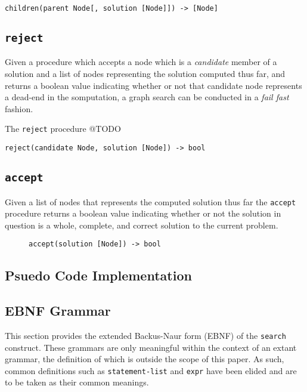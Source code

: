 \documentclass[runningheads]{llncs}
\newcommand{\code}[1]{\texttt{#1}}
\begin{document}
\begin{lstlisting}
children(parent Node[, solution [Node]]) -> [Node]
\end{lstlisting}

\subsection{\code{reject}}
Given a procedure which accepts a node which is a \textit{candidate} member of a solution and a list of nodes representing the solution computed thus far, and returns a boolean value indicating whether or not that candidate node represents a dead-end in the somputation, a graph search can be conducted in a \textit{fail fast} fashion.

The \code{reject} procedure @TODO

\begin{lstlisting}
reject(candidate Node, solution [Node]) -> bool
\end{lstlisting}

\subsection{\code{accept}}
Given a list of nodes that represents the computed solution thus far the \code{accept} procedure returns a boolean value indicating whether or not the solution in question is a whole, complete, and correct solution to the current problem.

\begin{figure}
\centering
\begin{lstlisting}
accept(solution [Node]) -> bool
\end{lstlisting}
\end{figure}

\subsection{Psuedo Code Implementation}

\subsection{EBNF Grammar}
This section provides the extended Backus-Naur form (EBNF) of the \code{search} construct. These grammars are only meaningful within the context of an extant grammar, the definition of which is outside the scope of this paper. As such, common definitions such as \code{statement-list} and \code{expr} have been elided and are to be taken as their common meanings.
\end{document}
